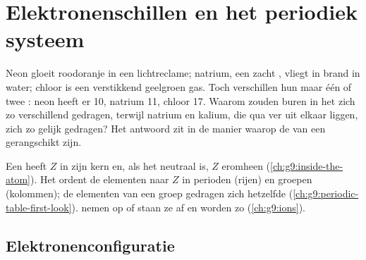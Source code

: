 \chapter{Elektronenschillen en het periodiek systeem}\label{ch:g10:electron-shells}

Neon gloeit roodoranje in een lichtreclame; natrium, een zacht ,
vliegt in brand in water; chloor is een verstikkend geelgroen gas. Toch
verschillen hun  maar één of twee : neon heeft er 10,
natrium 11, chloor 17. Waarom zouden buren in het  zich
zo verschillend gedragen, terwijl natrium en kalium, die qua 
ver uit elkaar liggen, zich zo gelijk gedragen? Het antwoord zit in de
manier waarop de  van een  gerangschikt zijn.

\begin{recall}
Een  heeft $Z$  in zijn kern en, als het neutraal is, $Z$
 eromheen (\cref{ch:g9:inside-the-atom}). Het 
ordent de elementen naar $Z$ in perioden (rijen) en groepen (kolommen);
de elementen van een groep gedragen zich hetzelfde
(\cref{ch:g9:periodic-table-first-look}).  nemen  op of
staan ze af en worden zo  (\cref{ch:g9:ions}).
\end{recall}

\section{Elektronenconfiguratie}

